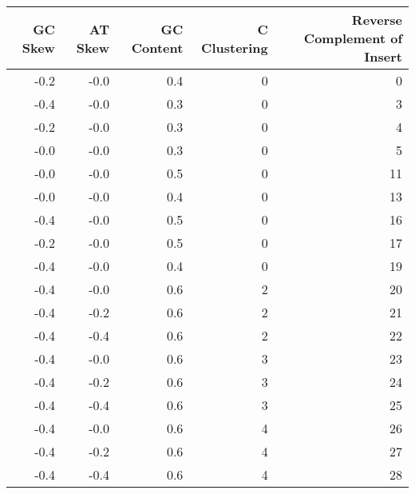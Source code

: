 \begin{table}
\centering
\caption{}
\label{table:2}
\begin{tabular}{rrrrr}
\toprule
 GC Skew &  AT Skew &  GC Content &  C Clustering &  Reverse Complement of Insert \\
\midrule
    -0.2 &     -0.0 &         0.4 &             0 &                             0 \\
    -0.4 &     -0.0 &         0.3 &             0 &                             3 \\
    -0.2 &     -0.0 &         0.3 &             0 &                             4 \\
    -0.0 &     -0.0 &         0.3 &             0 &                             5 \\
    -0.0 &     -0.0 &         0.5 &             0 &                            11 \\
    -0.0 &     -0.0 &         0.4 &             0 &                            13 \\
    -0.4 &     -0.0 &         0.5 &             0 &                            16 \\
    -0.2 &     -0.0 &         0.5 &             0 &                            17 \\
    -0.4 &     -0.0 &         0.4 &             0 &                            19 \\
    -0.4 &     -0.0 &         0.6 &             2 &                            20 \\
    -0.4 &     -0.2 &         0.6 &             2 &                            21 \\
    -0.4 &     -0.4 &         0.6 &             2 &                            22 \\
    -0.4 &     -0.0 &         0.6 &             3 &                            23 \\
    -0.4 &     -0.2 &         0.6 &             3 &                            24 \\
    -0.4 &     -0.4 &         0.6 &             3 &                            25 \\
    -0.4 &     -0.0 &         0.6 &             4 &                            26 \\
    -0.4 &     -0.2 &         0.6 &             4 &                            27 \\
    -0.4 &     -0.4 &         0.6 &             4 &                            28 \\
\bottomrule
\end{tabular}
\end{table}
